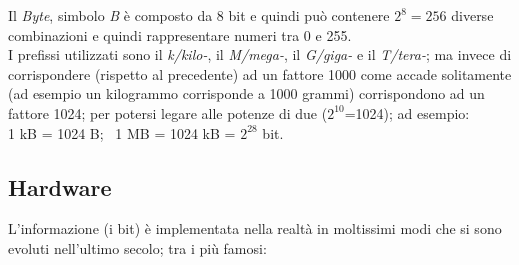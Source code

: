 Il \textit{Byte}, simbolo \textit{B} è composto da 8 bit e quindi può contenere $2^8 = 256$ diverse combinazioni e quindi rappresentare numeri tra 0 e 255.\\
I prefissi utilizzati sono il \textit{k/kilo-}, il \textit{M/mega-}, il \textit{G/giga-} e il \textit{T/tera-}; ma invece di corrispondere (rispetto al precedente) ad un fattore 1000 come accade solitamente (ad esempio un kilogrammo corrisponde a 1000 grammi) corrispondono ad un fattore 1024; per potersi legare alle potenze di due ($2^{10}$=1024); ad esempio:\\
1 kB = 1024 B; \ 1 MB = 1024 kB = $2^{28}$ bit.
\subsection{Hardware}
L'informazione (i bit) è implementata nella realtà in moltissimi modi che si sono evoluti nell'ultimo secolo; tra i più famosi:
